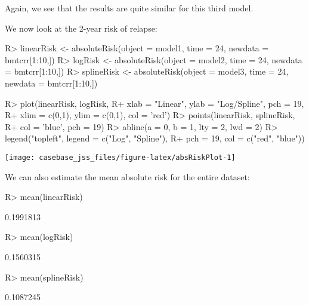 \documentclass[article]{jss}
\begin{document}
Again, we see that the results are quite similar for this third model.

We now look at the 2-year risk of relapse:

\begin{CodeChunk}

\begin{CodeInput}
R> linearRisk <- absoluteRisk(object = model1, time = 24, newdata = bmtcrr[1:10,])
R> logRisk <- absoluteRisk(object = model2, time = 24, newdata = bmtcrr[1:10,])
R> splineRisk <- absoluteRisk(object = model3, time = 24, newdata = bmtcrr[1:10,])
\end{CodeInput}
\end{CodeChunk}

\begin{CodeChunk}

\begin{CodeInput}
R> plot(linearRisk, logRisk,
R+      xlab = "Linear", ylab = "Log/Spline", pch = 19,
R+      xlim = c(0,1), ylim = c(0,1), col = 'red')
R> points(linearRisk, splineRisk,
R+        col = 'blue', pch = 19)
R> abline(a = 0, b = 1, lty = 2, lwd = 2)
R> legend("topleft", legend = c("Log", "Spline"),
R+        pch = 19, col = c("red", "blue"))
\end{CodeInput}


\begin{center}\texttt{[image: casebase\_jss\_files/figure-latex/absRiskPlot-1]} \end{center}

\end{CodeChunk}

We can also estimate the mean absolute risk for the entire dataset:

\begin{CodeChunk}

\begin{CodeInput}
R> mean(linearRisk)
\end{CodeInput}

\begin{CodeOutput}
[1] 0.1991813
\end{CodeOutput}

\begin{CodeInput}
R> mean(logRisk)
\end{CodeInput}

\begin{CodeOutput}
[1] 0.1560315
\end{CodeOutput}

\begin{CodeInput}
R> mean(splineRisk)
\end{CodeInput}

\begin{CodeOutput}
[1] 0.1087245
\end{CodeOutput}
\end{CodeChunk}
\end{document}
